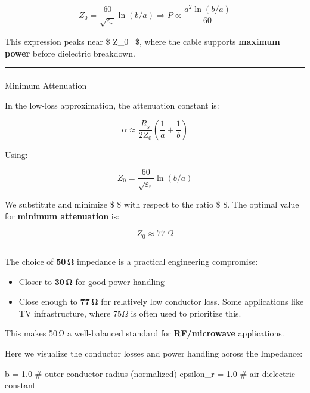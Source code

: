 \documentclass[
  letterpaper,
  DIV=11,
  numbers=noendperiod]{scrartcl}
\makeatletter
\let\oldparagraph\paragraph
\renewcommand{\paragraph}{
    \@ifstar
      \xxxParagraphStar
      \xxxParagraphNoStar
  }
\newcommand{\xxxParagraphStar}[1]{\oldparagraph*{#1}\mbox{}}
\newcommand{\xxxParagraphNoStar}[1]{\oldparagraph{#1}\mbox{}}
\newenvironment{Shaded}{\begin{snugshade}}{\end{snugshade}}
\newcommand{\CommentTok}[1]{\textcolor[rgb]{0.37,0.37,0.37}{#1}}
\newcommand{\FloatTok}[1]{\textcolor[rgb]{0.68,0.00,0.00}{#1}}
\newcommand{\NormalTok}[1]{\textcolor[rgb]{0.00,0.23,0.31}{#1}}
\newcommand{\OperatorTok}[1]{\textcolor[rgb]{0.37,0.37,0.37}{#1}}
\providecommand{\tightlist}{%
  \setlength{\itemsep}{0pt}\setlength{\parskip}{0pt}}
\makeatother
\begin{document}
\[
Z_0 = \frac{60}{\sqrt{\varepsilon_r}} \ln(b/a)
\Rightarrow
P \propto \frac{a^2 \ln(b/a)}{60}
\]

This expression peaks near \$ Z\_0 ~\Omega \$, where the cable
supports \textbf{maximum power} before dielectric breakdown.

\begin{center}\rule{0.5\linewidth}{0.5pt}\end{center}

\paragraph{Minimum Attenuation}\label{minimum-attenuation}

In the low-loss approximation, the attenuation constant is:

\[
\alpha \approx \frac{R_s}{2Z_0} \left( \frac{1}{a} + \frac{1}{b} \right)
\]

Using:

\[
Z_0 = \frac{60}{\sqrt{\varepsilon_r}} \ln(b/a)
\]

We substitute and minimize \$ \alpha \$ with respect to the ratio \$
 \$. The optimal value for \textbf{minimum attenuation} is:

\[
Z_0 \approx 77\ \Omega
\]

\begin{center}\rule{0.5\linewidth}{0.5pt}\end{center}

The choice of \textbf{50\,Ω} impedance is a practical engineering
compromise:

\begin{itemize}
\tightlist
\item
  Closer to \textbf{30\,Ω} for good power handling\\
\item
  Close enough to \textbf{77\,Ω} for relatively low conductor loss. Some
  applications like TV infrastructure, where \(75\Omega\) is often used
  to prioritize this.
\end{itemize}

This makes 50\,Ω a well-balanced standard for \textbf{RF/microwave}
applications.

Here we visualize the conductor losses and power handling across the
Impedance:

\begin{Shaded}
\begin{Highlighting}[]
\NormalTok{b }\OperatorTok{=} \FloatTok{1.0}  \CommentTok{\# outer conductor radius (normalized)}
\NormalTok{epsilon\_r }\OperatorTok{=} \FloatTok{1.0}  \CommentTok{\# air dielectric constant}
\end{Highlighting}
\end{Shaded}
\end{document}
